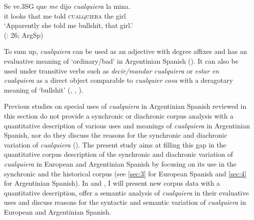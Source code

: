 \ea \label{ex:key:72} %
  \gll Se ve.3SG que \textit{me} {dijo} \textit{cualquiera} la mina.\\
  it looks that me told \textsc{cualquiera} the girl\\
  \glt ‘Apparently she told me bullshit, that girl.’\\
  (\citealt{Rizzosalierno2013}: 26; ArgSp)
\z

To sum up, \textit{cualquiera} can be used as an adjective with degree affixes and has an evaluative meaning of ‘ordinary/bad’ in Argentinian Spanish (\citealt{Rizzosalierno2013}). It can also be used under transitive verbs such as \textit{decir/mandar} \textit{cualquiera} or \textit{estar en cualquiera} as a direct object comparable to \textit{cualquier cosa} with a deragotary meaning of ‘bullshit’ (\citealt{Conde2011}, \citealt{Tullio2013}, \citealt{Company2009}). %


\begin{table}
\caption{\label{tab:key:1} \textit{Cualquiera} with evaluative meanings in Argentinian Spanish}
\end{table}  %

Previous studies on special uses of \textit{cualquiera} in Argentinian Spanish reviewed in this section do not provide a synchronic or diachronic corpus analysis with a quantitative description of various uses and meanings of \textit{cualquiera} in Argentinian Spanish, nor do they discuss the reasons for the synchronic and diachronic variation of \textit{cualquiera} (). The present study aims at filling this gap in the quantitative corpus description of the synchronic and diachronic variation of \textit{cualquiera} in European and Argentinian Spanish by focusing on its use in the synchronic and the historical corpus (see \ref{sec:3} for European Spanish and \ref{sec:4} for Argentinian Spanish). In  and , I will present new corpus data with a quantitative description, offer a semantic analysis of \textit{cualquiera} in their evaluative uses and discuss reasons for the syntactic and semantic variation of \textit{cualquiera} in European and Argentinian Spanish.

